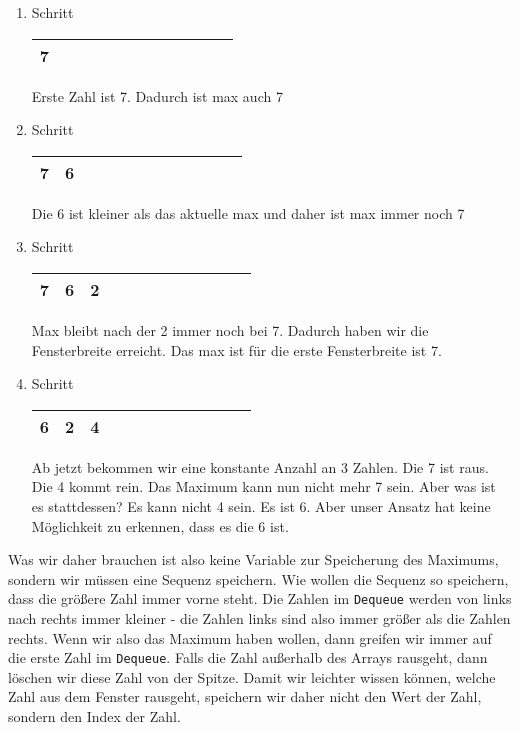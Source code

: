 \documentclass[babel]{book}
\begin{document}
\begin{enumerate} 
	\item Schritt
	
	\begin{tabular}{|l|l|l|l|l|l|l|l|l|l|l|l|} 
		\hline
		7 \\
		\hline
	\end{tabular} 

	Erste Zahl ist 7. Dadurch ist max auch 7
	\item Schritt
	
	\begin{tabular}{|l|l|l|l|l|l|l|l|l|l|l|l|} 
		\hline
		7 & 6 \\
		\hline
	\end{tabular} 

	Die 6 ist kleiner als das aktuelle max und daher ist max immer noch 7
	\item Schritt
	
	\begin{tabular}{|l|l|l|l|l|l|l|l|l|l|l|l|} 
		\hline
		7 & 6 & 2\\
		\hline
	\end{tabular} 
			
	Max bleibt nach der 2 immer noch bei 7. Dadurch haben wir die Fensterbreite erreicht. Das max ist für die erste Fensterbreite ist 7.
	
	\item Schritt
	
	\begin{tabular}{|l|l|l|l|l|l|l|l|l|l|l|l|} 
		\hline
		6 & 2 & 4\\
		\hline
	\end{tabular}  

	Ab jetzt bekommen wir eine konstante Anzahl an 3 Zahlen. Die 7 ist raus. Die 4 kommt rein. Das Maximum kann nun nicht mehr 7 sein. Aber was ist es stattdessen? Es kann nicht 4 sein. Es ist 6. Aber unser Ansatz hat keine Möglichkeit zu erkennen, dass es die 6 ist. 
\end{enumerate}

Was wir daher brauchen ist also keine Variable zur Speicherung des Maximums, sondern wir müssen eine Sequenz speichern. Wie wollen die Sequenz so speichern, dass die größere Zahl immer vorne steht. Die Zahlen im \lstinline|Dequeue| werden von links nach rechts immer kleiner - die Zahlen links sind also immer größer als die Zahlen rechts. Wenn wir also das Maximum haben wollen, dann greifen wir immer auf die erste Zahl im \lstinline|Dequeue|. Falls die Zahl außerhalb des Arrays rausgeht, dann löschen wir diese Zahl von der Spitze. Damit wir leichter wissen können, welche Zahl aus dem Fenster rausgeht, speichern wir daher nicht den Wert der Zahl, sondern den Index der Zahl.
\end{document}
